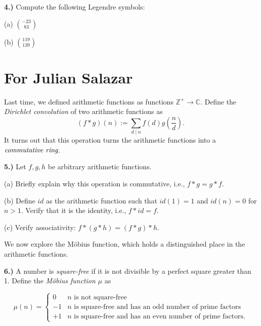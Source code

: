 \documentclass[10pt]{amsart}
\begin{document}
\medskip

{\bf 4.)} Compute the following Legendre symbols:

\smallskip

(a) ${-23 \choose 83}$

\smallskip

(b) ${119 \choose 139}$

\section*{For Julian Salazar}

\noindent Last time, we defined arithmetic functions as functions $\mathbb{Z}^+ \to \mathbb{C}$. Define the \emph{Dirichlet convolution} of two arithmetic functions as
\[
(f * g)(n) := \sum_{d \mid n} f(d) g\left(\frac{n}{d}\right).
\]
It turns out that this operation turns the arithmetic functions into a $\emph{commutative ring}$.

\medskip

{\bf 5.)} Let $f, g, h$ be arbitrary arithmetic functions.

\smallskip

(a) Briefly explain why this operation is commutative, i.e., $f * g = g * f$.

\smallskip

(b) Define $id$ as the arithmetic function such that $id(1) = 1$ and $id(n) = 0$ for $n > 1$. Verify that it is the identity, i.e., $f * id = f$.

\smallskip

(c) Verify associativity: $f * (g * h) = (f * g) * h$.

\medskip

\noindent We now explore the M{\"o}bius function, which holds a distinguished place in the arithmetic functions.

\medskip

{\bf 6.)} A number is \emph{square-free} if it is not divisible by a perfect square greater than 1. Define the \emph{M{\"o}bius function $\mu$} as 

\[
\mu(n) = \begin{cases} 
 0 & n\text{ is not square-free} \\
-1 & n\text{ is square-free and has an odd number of prime factors} \\ +1 & n \text{ is square-free and has an even number of prime factors.} \end{cases}
\]

\smallskip
\end{document}
